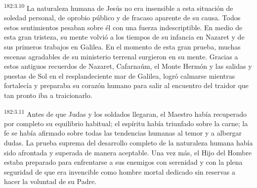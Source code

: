 \par 
\textsuperscript{182:3.10} La naturaleza humana de Jesús no era insensible a esta situación de soledad personal, de oprobio público y de fracaso aparente de su causa. Todos estos sentimientos pesaban sobre él con una fuerza indescriptible. En medio de esta gran tristeza, su mente volvió a los tiempos de su infancia en Nazaret y de sus primeros trabajos en Galilea. En el momento de esta gran prueba, muchas escenas agradables de su ministerio terrenal surgieron en su mente. Gracias a estos antiguos recuerdos de Nazaret, Cafarnaúm, el Monte Hermón y las salidas y puestas de Sol en el resplandeciente mar de Galilea, logró calmarse mientras fortalecía y preparaba su corazón humano para salir al encuentro del traidor que tan pronto iba a traicionarlo.

\par 
\textsuperscript{182:3.11} Antes de que Judas y los soldados llegaran, el Maestro había recuperado por completo su equilibrio habitual; el espíritu había triunfado sobre la carne; la fe se había afirmado sobre todas las tendencias humanas al temor y a albergar dudas. La prueba suprema del desarrollo completo de la naturaleza humana había sido afrontada y superada de manera aceptable. Una vez más, el Hijo del Hombre estaba preparado para enfrentarse a sus enemigos con serenidad y con la plena seguridad de que era invencible como hombre mortal dedicado sin reservas a hacer la voluntad de su Padre.